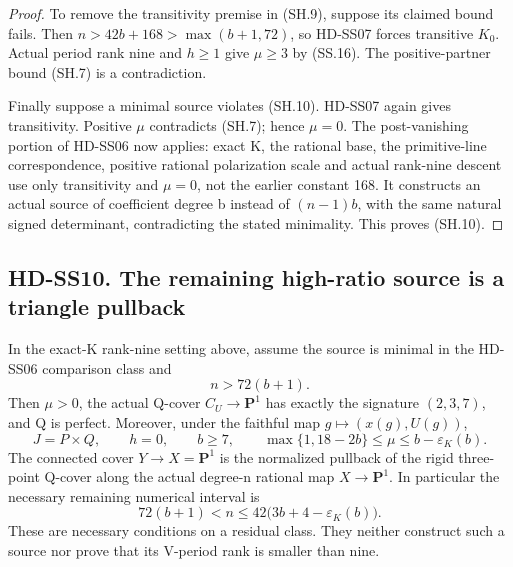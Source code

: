\begin{proof}
To remove the transitivity premise in (SH.9), suppose its claimed
bound fails. Then \(n>42b+168>\max(b+1,72)\), so HD-SS07
forces transitive \(K_0\). Actual period rank nine and \(h\ge1\)
give \(\mu\ge3\) by (SS.16). The positive-partner bound (SH.7)
is a contradiction.

Finally suppose a minimal source violates (SH.10). HD-SS07 again
gives transitivity. Positive \(\mu\) contradicts (SH.7); hence
\(\mu=0\). The post-vanishing portion of HD-SS06 now applies:
exact K, the rational base, the primitive-line correspondence,
positive rational polarization scale and actual rank-nine descent
use only transitivity and \(\mu=0\), not the earlier constant 168.
It constructs an actual source of coefficient degree b instead of
\((n-1)b\), with the same natural signed determinant, contradicting
the stated minimality. This proves (SH.10).
\end{proof}

\subsection*{HD-SS10. The remaining high-ratio source is a triangle pullback}

\begin{theorem}[HD-SS10]
In the exact-K rank-nine setting above, assume the source is minimal
in the HD-SS06 comparison class and
\[
                              n>72(b+1).
 \tag{SH.12}
\]
Then \(\mu>0\), the actual Q-cover \(C_U\to\mathbf P^1\)
has exactly the signature \((2,3,7)\), and Q is perfect.
Moreover, under the faithful map \(g\mapsto(x(g),U(g))\),
\[
 J=P\times Q,\qquad h=0,\qquad b\ge7,
 \qquad
 \max\{1,18-2b\}\le\mu\le b-\varepsilon_K(b).
 \tag{SH.13}
\]
The connected cover \(Y\to X=\mathbf P^1\) is the normalized
pullback of the rigid three-point Q-cover along the actual degree-n
rational map \(X\to\mathbf P^1\). In particular the necessary
remaining numerical interval is
\[
              72(b+1)<n\le42\bigl(3b+4-\varepsilon_K(b)\bigr).
 \tag{SH.14}
\]
These are necessary conditions on a residual class. They neither
construct such a source nor prove that its V-period rank is smaller
than nine.
\end{theorem}

